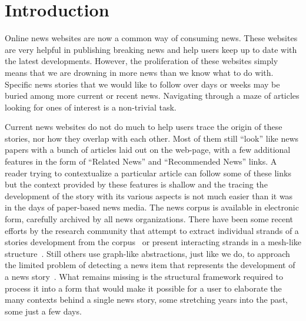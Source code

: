 \section{Introduction}
Online news websites are now a common way of consuming news. These
websites are very helpful in publishing breaking news and help users
keep up to date with the latest developments. However, the
proliferation of these websites simply means that we are drowning in
more news than we know what to do with. Specific news stories that we
would like to follow over days or weeks may be buried among more
current or recent news. Navigating through a maze of articles looking
for ones of interest is a non-trivial task.  

Current news websites do not do much to help users trace the origin of
these stories, nor how they overlap with each other. Most of them
still ``look'' like news papers with a bunch of articles laid out on
the web-page, with a few additional features in the form of ``Related
News'' and ``Recommended News'' links. A reader trying to
contextualize a particular article can follow some of these links but
the context provided by these features is shallow and the tracing the
development of the story with its various aspects is not much easier
than it was in the days of paper-based news media. The news corpus is
available in electronic form, carefully archived by all news
organizations. There have been some recent efforts by the research
community that attempt to extract individual strands of a stories
development from the corpus~\cite{shahaf@kdd2010} or present
interacting strands in a mesh-like
structure~\cite{shahaf@www2012}. Still others use graph-like
abstractions, just like we do, to approach the limited problem of
detecting a news item that represents the development of a news
story~\cite{subasic-icdm:2008,subasic-ida:2013}. What remains missing
is the structural framework required to process it into a form that
would make it possible for a user to elaborate the many contexts
behind a single news story, some stretching years into the past, some
just a few days. 

